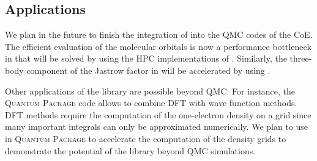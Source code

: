 \subsection{Applications}

\newcommand{\qp}{\textsc{Quantum Package}}

We plan in the future to finish the integration of \QMCkl{} into the \ac{QMC}
codes of the \ac{CoE}. The efficient evaluation of the molecular orbitals is
now a performance bottleneck in \turbo{} that will be solved by using the
\ac{HPC} implementations of \QMCkl{}. Similarly, the three-body component of
the Jastrow factor in \champ{} will be accelerated by using \QMCkl{}.

Other applications of the library are possible beyond \ac{QMC}. For instance, 
the \qp{} code allows to combine \ac{DFT} with wave function
methods. \ac{DFT} methods require the computation of the one-electron density on 
a grid since many important integrals can only be approximated numerically. We
plan to use \QMCkl{} in \qp{} to accelerate the computation of the density grids
to demonstrate the potential of the library beyond \ac{QMC} simulations.


\clearpage


